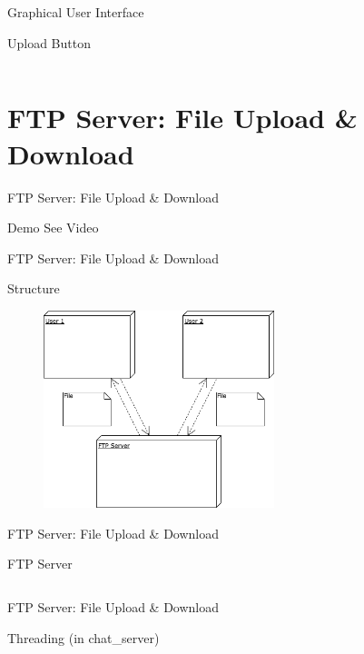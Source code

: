 \documentclass[a4paper,10pt]{beamer}
\begin{document}
\begin{frame}{Graphical User Interface}
\begin{block}{Upload Button}
\inputminted[linenos]{python}{upload.py}
\end{block}
\end{frame}

\section{FTP Server: File Upload \& Download}

\begin{frame}{FTP Server: File Upload \& Download}
\begin{block}{Demo}
See Video
\end{block}
\end{frame}

\begin{frame}{FTP Server: File Upload \& Download}
\begin{block}{Structure}
\begin{figure}[H]
    \includegraphics[width=0.6\textwidth]{Structure.png}
\end{figure}
\end{block}
\end{frame}

\begin{frame}{FTP Server: File Upload \& Download}
	\begin{block}{FTP Server}
	\inputminted[linenos]{python}{file_server.py}
	\end{block}
\end{frame}

\begin{frame}{FTP Server: File Upload \& Download}
	\begin{block}{Threading (in chat\_server)}
	\inputminted[linenos]{python}{threading.py}
	\end{block}
\end{frame}
\end{document}
